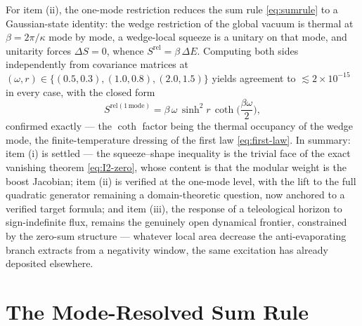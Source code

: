 \documentclass[11pt]{article}
\newcommand{\Srel}{S^{\mathrm{rel}}}
\begin{document}
For item (ii), the one-mode restriction reduces the sum rule \eqref{eq:sumrule} to a Gaussian-state identity: the wedge restriction of the global vacuum is thermal at $\beta = 2\pi/\kappa$ mode by mode, a wedge-local squeeze is a unitary on that mode, and unitarity forces $\Delta S = 0$, whence $\Srel = \beta\,\Delta E$. Computing both sides independently from covariance matrices at $(\omega, r) \in \{(0.5, 0.3), (1.0, 0.8), (2.0, 1.5)\}$ yields agreement to $\lesssim 2\times 10^{-15}$ in every case, with the closed form
\begin{equation}
S^{\mathrm{rel}(\mathrm{1\,mode})} = \beta\,\omega\, \sinh^2\! r \, \coth\!\Big(\frac{\beta\omega}{2}\Big),
\label{eq:one-mode}
\end{equation}
confirmed exactly --- the $\coth$ factor being the thermal occupancy of the wedge mode, the finite-temperature dressing of the first law \eqref{eq:first-law}. In summary: item (i) is settled --- the squeeze--shape inequality is the trivial face of the exact vanishing theorem \eqref{eq:I2-zero}, whose content is that the modular weight is the boost Jacobian; item (ii) is verified at the one-mode level, with the lift to the full quadratic generator remaining a domain-theoretic question, now anchored to a verified target formula; and item (iii), the response of a teleological horizon to sign-indefinite flux, remains the genuinely open dynamical frontier, constrained by the zero-sum structure --- whatever local area decrease the anti-evaporating branch extracts from a negativity window, the same excitation has already deposited elsewhere.


\section{The Mode-Resolved Sum Rule}
\end{document}
